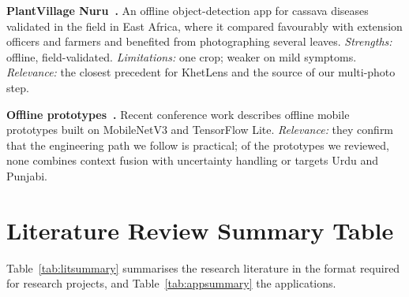 \textbf{PlantVillage Nuru~\cite{mrisho2020nuru}.} An offline object-detection app for cassava diseases validated in the field in East Africa, where it compared favourably with extension officers and farmers and benefited from photographing several leaves. \emph{Strengths:} offline, field-validated. \emph{Limitations:} one crop; weaker on mild symptoms. \emph{Relevance:} the closest precedent for KhetLens and the source of our multi-photo step.

\textbf{Offline prototypes~\cite{offlinemnv3app2026}.} Recent conference work describes offline mobile prototypes built on MobileNetV3 and TensorFlow Lite. \emph{Relevance:} they confirm that the engineering path we follow is practical; of the prototypes we reviewed, none combines context fusion with uncertainty handling or targets Urdu and Punjabi.

\section{Literature Review Summary Table}
\label{sec:littable}
Table~\ref{tab:litsummary} summarises the research literature in the format required for research projects, and Table~\ref{tab:appsummary} the applications.

